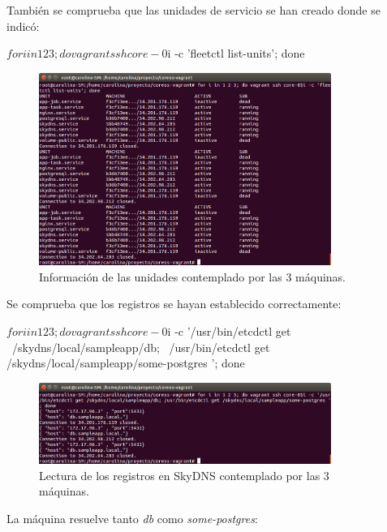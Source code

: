 También se comprueba que las unidades de servicio se han creado donde se indicó:
\begin{code}
$ for i in 1 2 3; do vagrant ssh core-0$i -c 'fleetctl list-units'; done
\end{code}

\begin{figure}[H]
\centering
\includegraphics[width=0.85\textwidth]{images/figures/skydns-units.png}
\caption{Información de las unidades contemplado por las 3 máquinas.\label{fig:figure_placement_example}}
\end{figure}

Se comprueba que los registros se hayan establecido correctamente:

\begin{code}
$ for i in 1 2 3; do vagrant ssh core-0$i -c '/usr/bin/etcdctl get \
  /skydns/local/sampleapp/db; \
  /usr/bin/etcdctl get /skydns/local/sampleapp/some-postgres '; done
\end{code}

\begin{figure}[H]
\centering
\includegraphics[width=0.85\textwidth]{images/figures/skydns-gets.png}
\caption{Lectura de los registros en SkyDNS contemplado por las 3 máquinas.\label{fig:figure_placement_example}}
\end{figure}

La máquina  resuelve tanto \textit{db} como \textit{some-postgres}:


